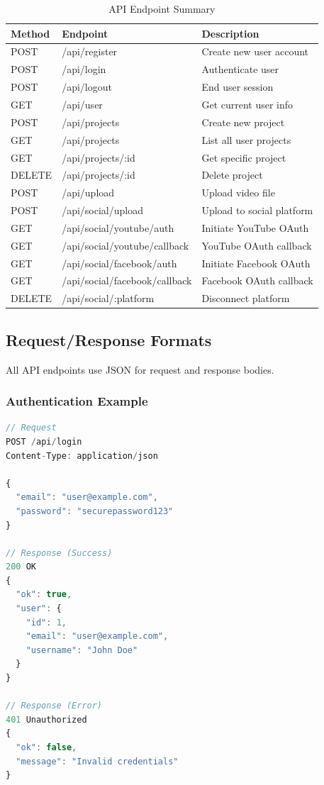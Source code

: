 \begin{table}[H]
\centering
\caption{API Endpoint Summary}
\begin{tabular}{@{}llp{6cm}@{}}
\toprule
\textbf{Method} & \textbf{Endpoint} & \textbf{Description} \\
\midrule
POST & /api/register & Create new user account \\
POST & /api/login & Authenticate user \\
POST & /api/logout & End user session \\
GET & /api/user & Get current user info \\
\midrule
POST & /api/projects & Create new project \\
GET & /api/projects & List all user projects \\
GET & /api/projects/:id & Get specific project \\
DELETE & /api/projects/:id & Delete project \\
\midrule
POST & /api/upload & Upload video file \\
POST & /api/social/upload & Upload to social platform \\
\midrule
GET & /api/social/youtube/auth & Initiate YouTube OAuth \\
GET & /api/social/youtube/callback & YouTube OAuth callback \\
GET & /api/social/facebook/auth & Initiate Facebook OAuth \\
GET & /api/social/facebook/callback & Facebook OAuth callback \\
DELETE & /api/social/:platform & Disconnect platform \\
\bottomrule
\end{tabular}
\end{table}

\subsection{Request/Response Formats}

All API endpoints use JSON for request and response bodies.

\subsubsection{Authentication Example}

\begin{lstlisting}[language=JavaScript, caption=Login Request/Response]
// Request
POST /api/login
Content-Type: application/json

{
  "email": "user@example.com",
  "password": "securepassword123"
}

// Response (Success)
200 OK
{
  "ok": true,
  "user": {
    "id": 1,
    "email": "user@example.com",
    "username": "John Doe"
  }
}

// Response (Error)
401 Unauthorized
{
  "ok": false,
  "message": "Invalid credentials"
}
\end{lstlisting}

